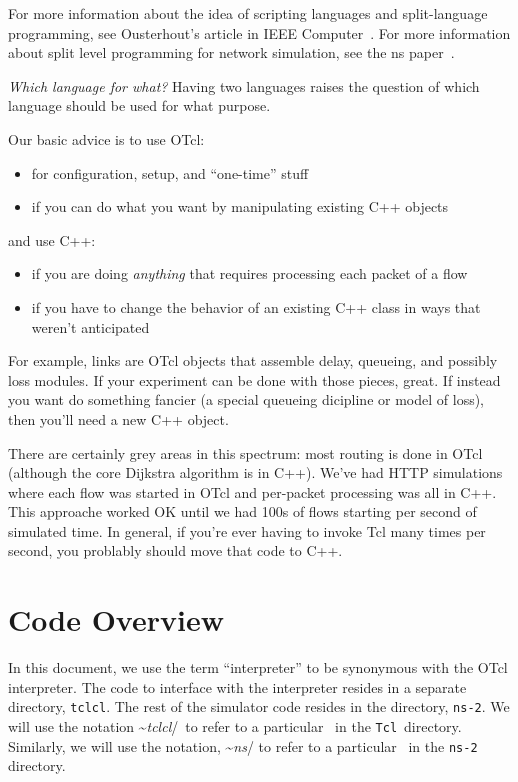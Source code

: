 For more information about the idea of scripting languages
  and split-language programming, see Ousterhout's article
  in IEEE Computer~\cite{Ousterhout98a}.
For more information about split level programming for network simulation,
  see the ns paper~\cite{Bajaj99a}.


\emph{Which language for what?}
Having two languages raises the question of which language should
be used for what purpose.

Our basic advice is to use OTcl:
\begin{itemize}
\item for configuration, setup, and ``one-time'' stuff
\item if you can do what you want by manipulating existing C++ objects
\end{itemize}

and use C++:
\begin{itemize}
\item if you are doing \emph{anything} that requires processing
        each packet of a flow
\item if you have to change the behavior of an existing C++ class
        in ways that weren't anticipated
\end{itemize}

For example, links are OTcl objects that assemble delay, queueing, and
possibly loss modules.  If your experiment can be done with those
pieces, great.  If instead you want do something fancier (a special
queueing dicipline or model of loss), then you'll need a new C++
object.

There are certainly grey areas in this spectrum:
most routing is done in OTcl
(although the core Dijkstra algorithm is in C++).
We've had HTTP simulations where each flow was started in OTcl
  and per-packet processing was all in C++.
This approache worked OK until we had 100s of flows
  starting per second of simulated time.
In general, if you're ever having to invoke Tcl many times per second,
  you problably should move that code to C++.


\section{Code Overview}

In this document,
we use the term ``interpreter''
to be synonymous with the OTcl interpreter.
The code to interface with the interpreter resides
in a separate directory, {\tt tclcl}.
The rest of the simulator code resides in the directory, {\tt ns-2}.
We will use the notation \textasciitilde\emph{tclcl}/{}\
to refer to a particular \ in the
{\tt Tcl}\ directory.
Similarly, we will use the notation, \textasciitilde\emph{ns}/{}
to refer to a particular \tup{file}\ in the {\tt ns-2} directory.

